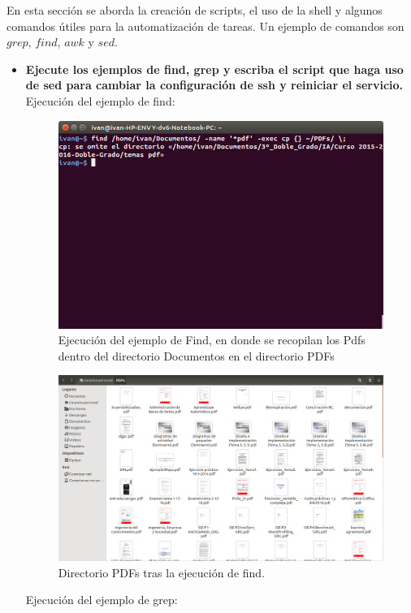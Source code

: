 En esta sección se aborda la creación de scripts, el uso de la shell y algunos comandos útiles para la automatización de tareas. Un ejemplo de comandos son $grep$\cite{man_grep}, $find$\cite{man_find}, $awk$\cite{man_awk} y $sed$\cite{man_sed}.

\begin{itemize}
	\item  \textbf{Ejecute los ejemplos de find, grep y escriba el script que haga uso de sed para cambiar la configuración de ssh y reiniciar el servicio.}\\
	
	Ejecución del ejemplo de find:\\
	
	\begin{figure}[H]
		\centering
		\includegraphics[width=0.7\linewidth]{ejemploFind}
		\caption[Ejemplo find]{Ejecución del ejemplo de Find, en donde se recopilan los Pdfs dentro del directorio Documentos en el directorio PDFs}
		\label{fig:ejemploFind}
	\end{figure}
	
	\begin{figure}[H]
		\centering
		\includegraphics[width=0.7\linewidth]{PDFsGuardados}
		\caption[PDFs almacenados.]{Directorio PDFs tras la ejecución de find.}
		\label{fig:PDFsGuardados}
	\end{figure}
	
	Ejecución del ejemplo de grep:\\
	

\end{itemize}
